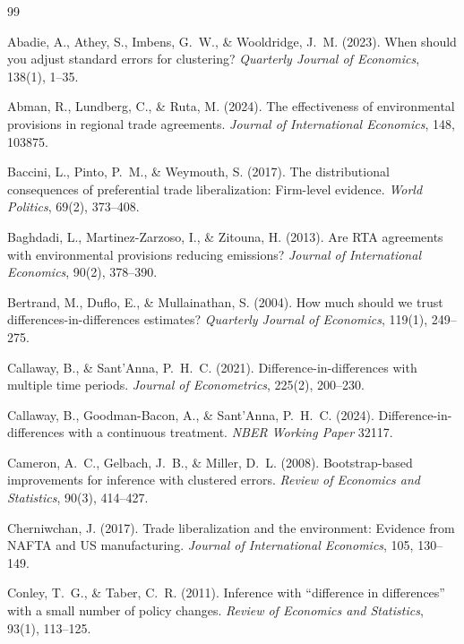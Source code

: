 \documentclass[12pt]{article}
\begin{document}
\begin{thebibliography}{99}

Abadie, A., Athey, S., Imbens, G.~W., \& Wooldridge, J.~M. (2023).
When should you adjust standard errors for clustering?
\textit{Quarterly Journal of Economics}, 138(1), 1--35.

Abman, R., Lundberg, C., \& Ruta, M. (2024).
The effectiveness of environmental provisions in regional trade agreements.
\textit{Journal of International Economics}, 148, 103875.

Baccini, L., Pinto, P.~M., \& Weymouth, S. (2017).
The distributional consequences of preferential trade liberalization: Firm-level evidence.
\textit{World Politics}, 69(2), 373--408.

Baghdadi, L., Martinez-Zarzoso, I., \& Zitouna, H. (2013).
Are RTA agreements with environmental provisions reducing emissions?
\textit{Journal of International Economics}, 90(2), 378--390.

Bertrand, M., Duflo, E., \& Mullainathan, S. (2004).
How much should we trust differences-in-differences estimates?
\textit{Quarterly Journal of Economics}, 119(1), 249--275.

Callaway, B., \& Sant'Anna, P.~H.~C. (2021).
Difference-in-differences with multiple time periods.
\textit{Journal of Econometrics}, 225(2), 200--230.

Callaway, B., Goodman-Bacon, A., \& Sant'Anna, P.~H.~C. (2024).
Difference-in-differences with a continuous treatment.
\textit{NBER Working Paper} 32117.

Cameron, A.~C., Gelbach, J.~B., \& Miller, D.~L. (2008).
Bootstrap-based improvements for inference with clustered errors.
\textit{Review of Economics and Statistics}, 90(3), 414--427.

Cherniwchan, J. (2017).
Trade liberalization and the environment: Evidence from NAFTA and US manufacturing.
\textit{Journal of International Economics}, 105, 130--149.

Conley, T.~G., \& Taber, C.~R. (2011).
Inference with ``difference in differences'' with a small number of policy changes.
\textit{Review of Economics and Statistics}, 93(1), 113--125.


\end{thebibliography}
\end{document}
